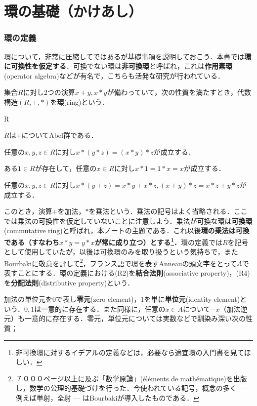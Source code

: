 \setcounter{part}{-1}
\part[Definition of Ring and more...]{環の基礎（かけあし）}
\section{環の定義}

環について，非常に圧縮してではあるが基礎事項を説明しておこう．本書では\textbf{環に可換性を仮定する}．可換でない環は\textbf{非可換環}と呼ばれ，これは\textbf{作用素環}(operator algebra)などが有名で，こちらも活発な研究が行われている．
\begin{defi}[環]
	集合$R$に対し2つの演算$x+y,x*y$が備わっていて，次の性質を満たすとき，代数構造$(R,+,*)$を\textbf{環}(ring)という．
	\begin{defiterm}{R}
		\item $R$は$+$についてAbel群である．
		\item 任意の$x,y,z\in R$に対し$x*(y*z)=(x*y)*z$が成立する．
		\item ある$1\in R$が存在して，任意の$x\in R$に対し$x*1=1*x=x$が成立する．
		\item 任意の$x,y,z\in R$に対し$x*(y+z)=x*y+x*z, (x+y)*z=x*z+y*z$が成立する．
	\end{defiterm}
\end{defi}

このとき，演算$+$を加法，$*$を乗法という．乗法の記号はよく省略される．ここでは乗法の可換性を仮定していないことに注意しよう．乗法が可換な環は\textbf{可換環}(commutative ring)と呼ばれ，本ノートの主題である．これ以後\textbf{環の乗法は可換である（すなわち$x*y=y*x$が常に成り立つ）とする\footnote{非可換環に対するイデアルの定義などは，必要なら適宜環の入門書を見てほしい．}．}環の定義では$R$を記号として使用していたが，以後は可換環のみを取り扱うという気持ちで，またBourbakiに敬意を評して\footnote{７０００ページ以上に及ぶ「数学原論」(\'el\'ements de math\'ematique)を出版し，数学の公理的基礎づけを行った．今使われている記号，概念の多く --- 例えば単射，全射 --- はBourbakiが導入したものである．}，フランス語で環を表すAnneauの頭文字をとって$A$で表すことにする．環の定義における(R2)を\textbf{結合法則}(associative property)，(R4)を\textbf{分配法則}(distributive property)という．

加法の単位元を$0$で表し\textbf{零元}(zero element)，$1$を単に\textbf{単位元}(identity element)という．$0,1$は一意的に存在する．また同様に，任意の$x\in A$について$-x$（加法逆元）も一意的に存在する．零元，単位元については実数などで馴染み深い次の性質；

